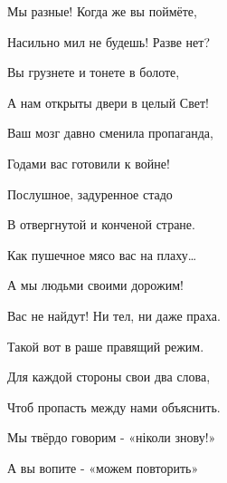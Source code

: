 Мы разные! Когда же вы поймёте,

Насильно мил не будешь! Разве нет?

Вы грузнете и тонете в болоте,

А нам открыты двери в целый Свет!


Ваш мозг давно сменила пропаганда,

Годами вас готовили к войне!

Послушное, задуренное стадо

В отвергнутой и конченой стране.


Как пушечное мясо вас на плаху…

А мы людьми своими дорожим!

Вас не найдут! Ни тел, ни даже праха.

Такой вот в раше правящий режим.


Для каждой стороны свои два слова,

Чтоб пропасть между нами объяснить.

Мы твёрдо говорим - «ніколи знову!»

А вы вопите - «можем повторить»
